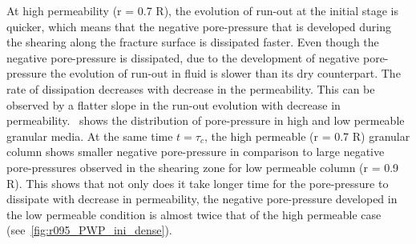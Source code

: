 At high permeability (r = 0.7 R), the evolution of run-out at the initial stage 
is quicker, which means that the negative pore-pressure that is developed 
during the shearing along the fracture surface is dissipated faster. Even 
though the negative pore-pressure is dissipated, due to 
the development of negative pore-pressure the evolution of run-out in fluid is 
slower than its dry counterpart. The rate of dissipation decreases with 
decrease in the permeability. This can be observed by a flatter slope in the 
run-out evolution with decrease in permeability.~ shows 
the distribution of pore-pressure in high and low permeable granular media. At 
the same time $ t = \tau_c$, the high permeable (r = 0.7 R) granular column 
shows smaller 
negative pore-pressure in comparison to large negative pore-pressures observed 
in the shearing zone for low permeable column (r = 0.9 R). This shows that not 
only does it take longer time for the pore-pressure to dissipate with decrease 
in permeability, the negative pore-pressure developed in the low permeable 
condition is almost twice that of the high permeable case 
(see~\cref{fig:r095_PWP_ini_dense}).

